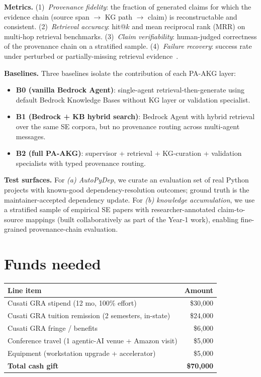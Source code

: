 \documentclass[11pt]{proposalnsf}
\begin{document}
\textbf{Metrics.} (1)~\textit{Provenance fidelity}: the fraction of generated claims for which the evidence chain (source span $\to$ KG path $\to$ claim) is reconstructable and consistent. (2)~\textit{Retrieval accuracy}: hit@$k$ and mean reciprocal rank (MRR) on multi-hop retrieval benchmarks. (3)~\textit{Claim verifiability}: human-judged correctness of the provenance chain on a stratified sample. (4)~\textit{Failure recovery}: success rate under perturbed or partially-missing retrieval evidence~\cite{Yan2024CRAG}.

\textbf{Baselines.} Three baselines isolate the contribution of each PA-AKG layer:

\begin{itemize}
    \item \textbf{B0 (vanilla Bedrock Agent)}: single-agent retrieval-then-generate using default Bedrock Knowledge Bases without KG layer or validation specialist.
    \item \textbf{B1 (Bedrock + KB hybrid search)}: Bedrock Agent with hybrid retrieval over the same SE corpora, but no provenance routing across multi-agent messages.
    \item \textbf{B2 (full PA-AKG)}: supervisor + retrieval + KG-curation + validation specialists with typed provenance routing.
\end{itemize}

\textbf{Test surfaces.} For \textit{(a) AutoPyDep}, we curate an evaluation set of real Python projects with known-good dependency-resolution outcomes; ground truth is the maintainer-accepted dependency update. For \textit{(b) knowledge accumulation}, we use a stratified sample of empirical SE papers with researcher-annotated claim-to-source mappings (built collaboratively as part of the Year-1 work), enabling fine-grained provenance-chain evaluation.

\section*{\normalsize Funds needed} 

\begin{table}[h]
\centering
\footnotesize
\begin{tabular}{p{3.2in} r}
\toprule
\textbf{Line item} & \textbf{Amount} \\
\midrule
Cusati GRA stipend (12 mo, 100\% effort) & \$30,000 \\
Cusati GRA tuition remission (2 semesters, in-state) & \$24,000 \\
Cusati GRA fringe / benefits & \$6,000 \\
Conference travel (1 agentic-AI venue + Amazon visit) & \$5,000 \\
Equipment (workstation upgrade + accelerator) & \$5,000 \\
\midrule
\textbf{Total cash gift} & \textbf{\$70,000} \\
\bottomrule
\end{tabular}
\end{table}
\end{document}
